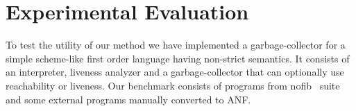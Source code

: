 \documentclass[9pt]{sigplanconf}
\newcommand{\comment}[1]{{\color{Myblue}{(#1)}}}
\begin{document}







\section{Experimental Evaluation}
\label{sec:experiments}

To   test  the   utility  of   our  method   we  have   implemented  a
garbage-collector for a simple scheme-like first order language having
non-strict semantics. It consists of an interpreter, liveness analyzer
and a  garbage-collector that can  optionally use  reachability or
liveness.  Our  benchmark consists  of programs  from nofib~\cite{nofib}  suite and
some external programs manually converted to ANF.
\end{document}
